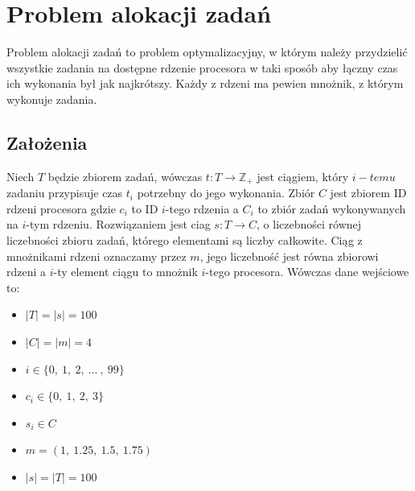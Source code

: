 \documentclass{article}
\begin{document}
\section{Problem alokacji zadań}
Problem alokacji zadań to problem optymalizacyjny, w którym należy przydzielić wszystkie zadania na dostępne rdzenie procesora w taki sposób aby łączny czas ich wykonania był jak najkrótszy. Każdy z rdzeni ma pewien mnożnik, z którym wykonuje zadania. 
    \subsection{Założenia}
    Niech $T$ będzie zbiorem zadań, wówczas $t:T\rightarrow \mathbb{Z_+}$ jest ciągiem, który $i-temu$ zadaniu przypisuje czas $t_i$ potrzebny do jego wykonania. Zbiór $C$ jest zbiorem ID rdzeni procesora gdzie $c_i$ to ID $i$-tego rdzenia a $C_i$ to zbiór zadań wykonywanych na $i$-tym rdzeniu. Rozwiązaniem jest ciag $s:T\rightarrow C$, o liczebności równej liczebności zbioru zadań, którego elementami są liczby całkowite.  Ciąg z mnożnikami rdzeni oznaczamy przez $m$, jego liczebność jest równa zbiorowi rdzeni a $i$-ty element ciągu to mnożnik $i$-tego procesora. Wówczas dane wejściowe to:
    \begin{itemize}
        \item $|T|=|s|=100$
        \item $|C|=|m|=4$
        \item $i\in\{0,\ 1,\ 2,\ ...\ ,\ 99\}$
        \item $c_i\in\{0,\ 1,\ 2,\ 3\}$
        \item $s_i\in C$
        \item $m=(1,\ 1.25,\ 1.5,\ 1.75)$
        \item $|s|=|T|=100$
    \end{itemize}
\end{document}
